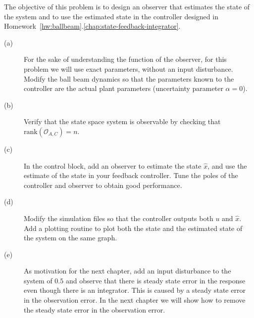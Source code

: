 The objective of this problem is to design an observer that estimates the state of the system and to use the estimated state in the controller designed in Homework~\ref{hw:ballbeam}.\ref{chap:state-feedback-integrator}.
\begin{description}
\item[(a)] For the sake of understanding the function of the observer, for this problem we will use exact parameters, without an input disturbance.  Modify the ball beam dynamics so that the parameters known to the controller are the actual plant parameters (uncertainty parameter $\alpha=0$).
\item[(b)] Verify that the state space system is observable by checking that $\text{rank}(\mathcal{O}_{A,C})=n$.
\item[(c)] In the control block, add an observer to estimate the state $\hat{x}$, and use the estimate of the state in your feedback controller. Tune the poles of the controller and observer to obtain good performance.  
\item[(d)] Modify the simulation files so that the controller outputs both $u$ and $\hat{x}$.  Add a plotting routine to plot both the state and the estimated state of the system on the same graph.
\item[(e)] As motivation for the next chapter, add an input disturbance to the system of $0.5$ and observe that there is steady state error in the response even though there is an integrator.  This is caused by a steady state error in the observation error.  In the next chapter we will show how to remove the steady state error in the observation error.
\end{description}
